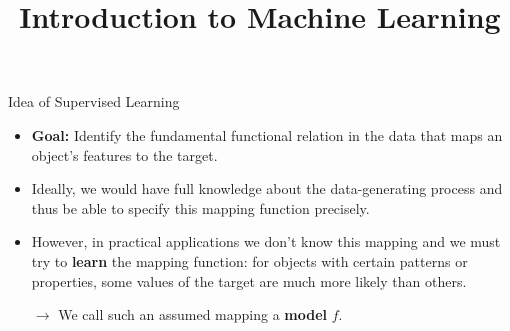 \documentclass[11pt,compress,t,notes=noshow, xcolor=table]{beamer}
\title{Introduction to Machine Learning}
\institute{\href{https://compstat-lmu.github.io/lecture_i2ml/}{compstat-lmu.github.io/lecture\_i2ml}}
\date{}
\begin{document}









\begin{vbframe}{Idea of Supervised Learning}

\begin{itemize}

  \item \textbf{Goal:} Identify the fundamental functional relation in the data 
  that maps an object's features to the target.
  
  \item Ideally, we would have full knowledge about the data-generating process
  and thus be able to specify this mapping function precisely.
  
  \item However, in practical applications we don't know this mapping and we must try to 
  \textbf{learn} the mapping function: for objects with certain 
  patterns or properties, some values of the target are much more likely than others.
  
  $\rightarrow$ We call such an assumed mapping a \textbf{model} $f$.
  
  
\end{itemize}  

\framebreak

\begin{itemize}

  

\end{itemize}
\end{vbframe}
\end{document}
